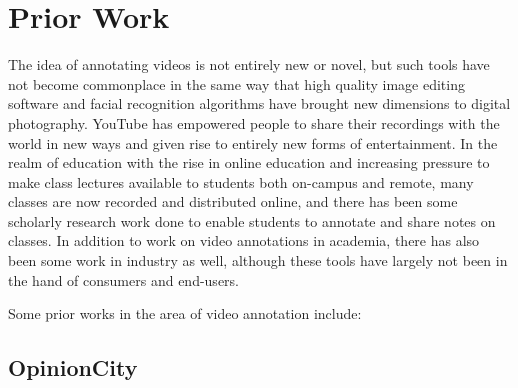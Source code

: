 %
\chapter{Prior Work}
\label{sec:priorwork}



The idea of annotating videos is not entirely new or novel, but such tools have not become commonplace in the same way that high quality image editing software and facial recognition algorithms have brought new dimensions to digital photography.  YouTube has empowered people to share their recordings with the world in new ways and given rise to entirely new forms of entertainment.  In the realm of education with the rise in online education and increasing pressure to make class lectures available to students both on-campus and remote, many classes are now recorded and distributed online, and there has been some scholarly research work done to enable students to annotate and share notes on classes.  In addition to work on video annotations in academia, there has also been some work in industry as well, although these tools have largely not been in the hand of consumers and end-users.

Some prior works in the area of video annotation include:





\section{OpinionCity}
\label{sec:priorwork:opinioncity}

